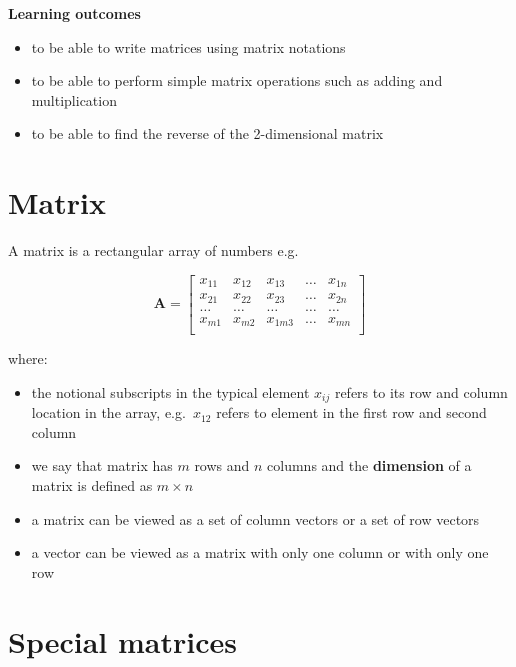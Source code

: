\documentclass[
]{book}
\providecommand{\tightlist}{%
  \setlength{\itemsep}{0pt}\setlength{\parskip}{0pt}}
\theoremstyle{definition}
\theoremstyle{definition}
\theoremstyle{definition}
\theoremstyle{remark}
\begin{document}
\textbf{Learning outcomes}

\begin{itemize}
\tightlist
\item
  to be able to write matrices using matrix notations
\item
  to be able to perform simple matrix operations such as adding and multiplication
\item
  to be able to find the reverse of the 2-dimensional matrix
\end{itemize}

\hypertarget{matrix}{%
\section{Matrix}\label{matrix}}

A matrix is a rectangular array of numbers e.g.~

\[\mathbf{A}=\begin{bmatrix}
  x_{11} & x_{12} & x_{13} & \dots & x_{1n} \\
  x_{21} & x_{22} & x_{23} & \dots & x_{2n} \\
  \dots & \dots & \dots& \dots & \dots\\
  x_{m1} & x_{m2} & x_{1m3} & \dots & x_{mn} \\
\end{bmatrix}\]

where:

\begin{itemize}
\tightlist
\item
  the notional subscripts in the typical element \(x_{ij}\) refers to its row and column location in the array, e.g.~\(x_{12}\) refers to element in the first row and second column
\item
  we say that matrix has \(m\) rows and \(n\) columns and the \textbf{dimension} of a matrix is defined as \(m \times n\)
\item
  a matrix can be viewed as a set of column vectors or a set of row vectors
\item
  a vector can be viewed as a matrix with only one column or with only one row
\end{itemize}

\hypertarget{special-matrices}{%
\section{Special matrices}\label{special-matrices}}
\end{document}
